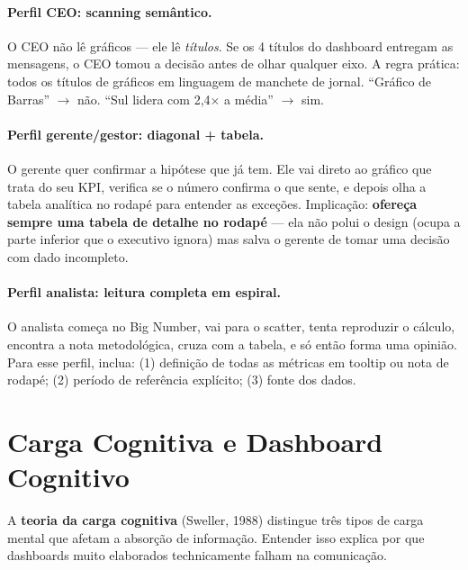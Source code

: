 \paragraph{Perfil CEO: scanning semântico.}
O CEO não lê gráficos --- ele lê \emph{títulos}. Se os 4 títulos do dashboard entregam as mensagens, o CEO tomou a decisão antes de olhar qualquer eixo. A regra prática: todos os títulos de gráficos em linguagem de manchete de jornal. ``Gráfico de Barras'' $\to$ não. ``Sul lidera com 2,4$\times$ a média'' $\to$ sim.

\paragraph{Perfil gerente/gestor: diagonal + tabela.}
O gerente quer confirmar a hipótese que já tem. Ele vai direto ao gráfico que trata do seu KPI, verifica se o número confirma o que sente, e depois olha a tabela analítica no rodapé para entender as exceções. Implicação: \textbf{ofereça sempre uma tabela de detalhe no rodapé} --- ela não polui o design (ocupa a parte inferior que o executivo ignora) mas salva o gerente de tomar uma decisão com dado incompleto.

\paragraph{Perfil analista: leitura completa em espiral.}
O analista começa no Big Number, vai para o scatter, tenta reproduzir o cálculo, encontra a nota metodológica, cruza com a tabela, e só então forma uma opinião. Para esse perfil, inclua: (1) definição de todas as métricas em tooltip ou nota de rodapé; (2) período de referência explícito; (3) fonte dos dados.

\section{Carga Cognitiva e Dashboard Cognitivo}
\label{sec:cognitivo}

A \textbf{teoria da carga cognitiva} (Sweller, 1988) distingue três tipos de carga mental que afetam a absorção de informação. Entender isso explica por que dashboards muito elaborados technicamente falham na comunicação.

